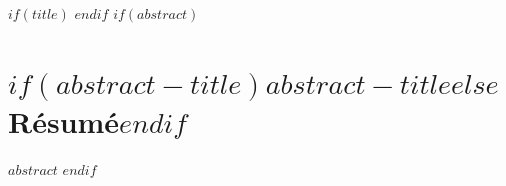 \frontmatter %
\pagestyle{plain}
$if(title)$
\maketitlepage
$endif$
$if(abstract)$
\chapter*{$if(abstract-title)$$abstract-title$$else$Résumé$endif$}
$abstract$
$endif$
